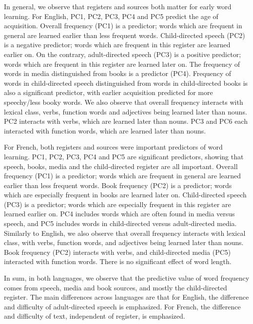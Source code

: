 \documentclass[10pt, letterpaper]{article}
\begin{document}
In general, we observe that registers and sources both matter for early
word learning. For English, PC1, PC2, PC3, PC4 and PC5 predict the age
of acquisition. Overall frequency (PC1) is a predictor; words which are
frequent in general are learned earlier than less frequent words.
Child-directed speech (PC2) is a negative predictor; words which are
frequent in this register are learned earlier on. On the contrary,
adult-directed speech (PC3) is a positive predictor; words which are
frequent in this register are learned later on. The frequency of words
in media distinguished from books is a predictor (PC4). Frequency of
words in child-directed speech distinguished from words in
child-directed books is also a significant predictor, with earlier
acquisition predicted for more speechy/less booky words. We also observe
that overall frequency interacts with lexical class, verbs, function
words and adjectives being learned later than nouns. PC2 interacts with
verbs, which are learned later than nouns. PC3 and PC6 each interacted
with function words, which are learned later than nouns.

For French, both registers and sources were important predictors of word
learning. PC1, PC2, PC3, PC4 and PC5 are significant predictors, showing
that speech, books, media and the child-directed register are all
important. Overall frequency (PC1) is a predictor; words which are
frequent in general are learned earlier than less frequent words. Book
frequency (PC2) is a predictor; words which are especially frequent in
books are learned later on. Child-directed speech (PC3) is a predictor;
words which are especially frequent in this register are learned earlier
on. PC4 includes words which are often found in media versus speech, and
PC5 includes words in child-directed versus adult-directed media.
Similarly to English, we also observe that overall frequency interacts
with lexical class, with verbs, function words, and adjectives being
learned later than nouns. Book frequency (PC2) interacts with verbs, and
child-directed media (PC5) interacted with function words. There is no
significant effect of word length.

In sum, in both languages, we observe that the predictive value of word
frequency comes from speech, media and book sources, and mostly the
child-directed register. The main differences across languages are that
for English, the difference and difficulty of adult-directed speech is
emphasized. For French, the difference and difficulty of text,
independent of register, is emphasized.
\end{document}
